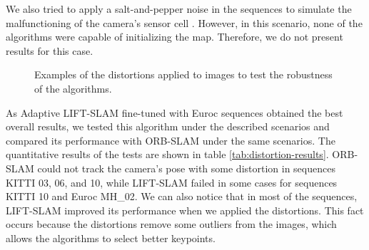 We also tried to apply a salt-and-pepper noise in the sequences to simulate the malfunctioning of the camera's sensor cell \cite{emulate-exposure}. However, in this scenario, none of the algorithms were capable of initializing the map. Therefore, we do not present results for this case.

\begin{figure}
\centering
{}




\caption{Examples of the distortions applied to images to test the robustness of the algorithms.}
\label{fig:distortions}
\end{figure}


As Adaptive LIFT-SLAM fine-tuned with Euroc sequences obtained the best overall results, we tested this algorithm under the described scenarios and compared its performance with ORB-SLAM under the same scenarios. The quantitative results of the tests are shown in table \ref{tab:distortion-results}. ORB-SLAM could not track the camera's pose with some distortion in sequences KITTI 03, 06, and 10, while LIFT-SLAM failed in some cases for sequences KITTI 10 and Euroc MH\_02. 
We can also notice that in most of the sequences, LIFT-SLAM improved its performance when we applied the distortions. This fact occurs because the distortions remove some outliers from the images, which allows the algorithms to select better keypoints.


